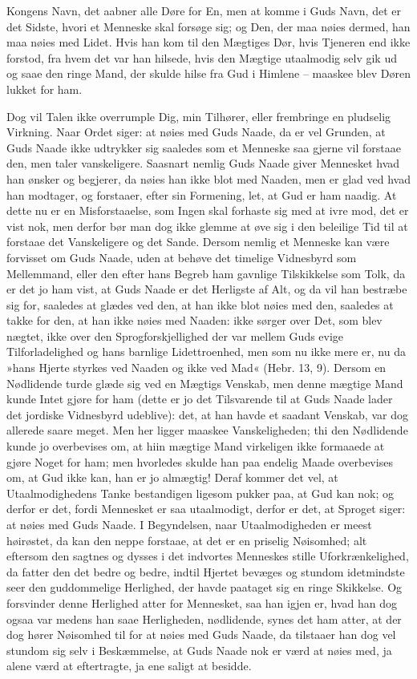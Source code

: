 \documentclass[12pt,a4paper]{article}
\begin{document}
Kongens Navn, det aabner alle Døre for En, men at komme i Guds Navn, det er det Sidste, hvori et Menneske skal forsøge sig; og Den, der maa nøies dermed, han maa nøies med Lidet. Hvis han kom til den Mægtiges Dør, hvis Tjeneren end ikke forstod, fra hvem det var han hilsede, hvis den Mægtige utaalmodig selv gik ud og saae den ringe Mand, der skulde hilse fra Gud i Himlene – maaskee blev Døren lukket for ham.

Dog vil Talen ikke overrumple Dig, min Tilhører, eller frembringe en pludselig Virkning. Naar Ordet siger: at nøies med Guds Naade, da er vel Grunden, at Guds Naade ikke udtrykker sig saaledes som et Menneske saa gjerne vil forstaae den, men taler vanskeligere. Saasnart nemlig Guds Naade giver Mennesket hvad han ønsker og begjerer, da nøies han ikke blot med Naaden, men er glad ved hvad han modtager, og forstaaer, efter sin Formening, let, at Gud er ham naadig. At dette nu er en Misforstaaelse, som Ingen skal forhaste sig med at ivre mod, det er vist nok, men derfor bør man dog ikke glemme at øve sig i den beleilige Tid til at forstaae det Vanskeligere og det Sande. Dersom nemlig et Menneske kan være forvisset om Guds Naade, uden at behøve det timelige Vidnesbyrd som Mellemmand, eller den efter hans Begreb ham gavnlige Tilskikkelse som Tolk, da er det jo ham vist, at Guds Naade er det Herligste af Alt, og da vil han bestræbe sig for, saaledes at glædes ved den, at han ikke blot nøies med den, saaledes at takke for den, at han ikke nøies med Naaden: ikke sørger over Det, som blev nægtet, ikke over den Sprogforskjellighed der var mellem Guds evige Tilforladelighed og hans barnlige Lidettroenhed, men som nu ikke mere er, nu da »hans Hjerte styrkes ved Naaden og ikke ved Mad« (Hebr. 13, 9). Dersom en Nødlidende turde glæde sig ved en Mægtigs Venskab, men denne mægtige Mand kunde Intet gjøre for ham (dette er jo det Tilsvarende til at Guds Naade lader det jordiske Vidnesbyrd udeblive): det, at han havde et saadant Venskab, var dog allerede saare meget. Men her ligger maaskee Vanskeligheden; thi den Nødlidende kunde jo overbevises om, at hiin mægtige Mand virkeligen ikke formaaede at gjøre Noget for ham; men hvorledes skulde han paa endelig Maade overbevises om, at Gud ikke kan, han er jo almægtig! Deraf kommer det vel, at Utaalmodighedens Tanke bestandigen ligesom pukker paa, at Gud kan nok; og derfor er det, fordi Mennesket er saa utaalmodigt, derfor er det, at Sproget siger: at nøies med Guds Naade. I Begyndelsen, naar Utaalmodigheden er meest høirøstet, da kan den neppe forstaae, at det er en priselig Nøisomhed; alt eftersom den sagtnes og dysses i det indvortes Menneskes stille Uforkrænkelighed, da fatter den det bedre og bedre, indtil Hjertet bevæges og stundom idetmindste seer den guddommelige Herlighed, der havde paataget sig en ringe Skikkelse. Og forsvinder denne Herlighed atter for Mennesket, saa han igjen er, hvad han dog ogsaa var medens han saae Herligheden, nødlidende, synes det ham atter, at der dog hører Nøisomhed til for at nøies med Guds Naade, da tilstaaer han dog vel stundom sig selv i Beskæmmelse, at Guds Naade nok er værd at nøies med, ja alene værd at eftertragte, ja ene saligt at besidde.
\end{document}
